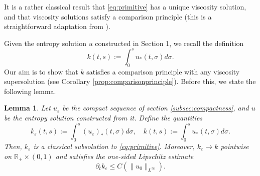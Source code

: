 \documentclass[11pt]{article}
\newtheorem{lemma}[thm]{Lemma}
\newtheorem{mydef}[thm]{Definition}
\numberwithin{equation}{section} %
\newcommand{\p}{{\partial}}
\newcommand{\R}{{\mathbb{R}}}
\newcommand{\ep}{\varepsilon}
\def \ep{\varepsilon}
\begin{document}

It is a rather classical result that \eqref{eq:primitive} has a unique viscosity solution, and that viscosity solutions satisfy a comparison principle (this is a straightforward adaptation from \cite[Theorems 4.3, 4.4]{CGV2022vortex}). 

Given the entropy solution $u$ constructed in Section 1, we recall the definition
\begin{equation*}
    k(t,s) := \int_0^s u_*(t,\sigma)d\sigma.
\end{equation*}
Our aim is to show that $k$ satisfies a comparison principle with any viscosity supersolution (see Corollary \ref{prop:comparisonprinciple}). Before this, we state the following lemma.
\begin{lemma}\label{lem:subsolution}
    Let $u_\ep$ be the compact sequence of section \ref{subsec:compactness}, and $u$ be the entropy solution constructed from it. Define the quantities
    \begin{equation*}
        k_\ep(t,s) := \int_0^s (u_\ep)_*(t,\sigma)d\sigma, \quad k(t,s) := \int_0^s u_*(t,\sigma)d\sigma.
    \end{equation*}
    Then, $k_\ep$ is a classical subsolution to \eqref{eq:primitive}. Moreover, $k_\ep \to k$ pointwise on $\R_+\times (0,1)$ and satisfies the one-sided Lipschitz estimate
    \begin{equation*}
        \p_t k_\ep \le C(\| u_0\|_{L^\infty}).
    \end{equation*}
\end{lemma}
\end{document}
